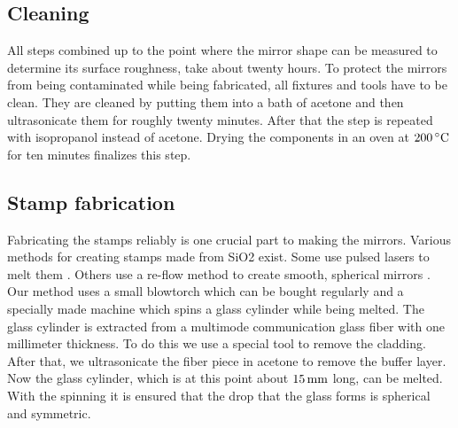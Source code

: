 \subsection{Cleaning}
All steps combined up to the point where the mirror shape can be measured to determine its surface roughness, take about twenty hours. To protect the mirrors from being contaminated while being fabricated, all fixtures and tools have to be clean. They are cleaned by putting them into a bath of acetone and then ultrasonicate them for roughly twenty minutes. After that the step is repeated with isopropanol instead of acetone. Drying the components in an oven at $200\degrees$ for ten minutes finalizes this step.

\subsection{Stamp fabrication}\label{ChapStampFabrication}
Fabricating the stamps reliably is one crucial part to making the mirrors. Various methods for creating stamps made from SiO2 exist. Some use pulsed lasers to melt them \cite{hasegawa2018fabrication}. Others use a re-flow method to create smooth, spherical mirrors \cite{roy2011fabrication}. Our method uses a small blowtorch which can be bought regularly and a specially made machine which spins a glass cylinder while being melted. The glass cylinder is extracted from a multimode communication glass fiber with one millimeter thickness. To do this we use a special tool to remove the cladding. After that, we ultrasonicate the fiber piece in acetone to remove the buffer layer. Now the glass cylinder, which is at this point about $15\mm$ long, can be melted. With the spinning it is ensured that the drop that the glass forms is spherical and symmetric.

